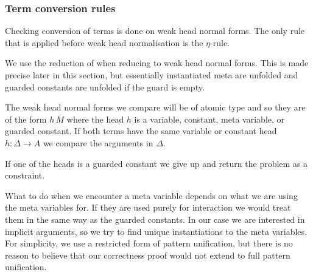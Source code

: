 \subsubsection{Term conversion rules}

Checking conversion of terms is done on weak head normal forms. The only rule
that is applied before weak head normalisation is the $\eta$-rule.


We use the reduction of {\Core} when reducing to weak head normal forms. This
is made precise later in this section, but essentially instantiated meta are
unfolded and guarded constants are unfolded if the guard is empty.

The weak head normal forms we compare will be of atomic type and so they are of
the form $h\,\bar M$ where the head $h$ is a variable, constant, meta variable,
or guarded constant. If both terms have the same variable or constant head $h :
\Delta \to A$ we compare the arguments in $\Delta$.


If one of the heads is a guarded constant we give up and return the problem as
a constraint.


What to do when we encounter a meta variable depends on what we are using the
meta variables for. If they are used purely for interaction we would treat them
in the same way as the guarded constants. In our case we are interested in
implicit arguments, so we try to find unique instantiations to the meta
variables. For simplicity, we use a restricted form of pattern
unification, but there is no
reason to believe that our correctness proof would not extend to full pattern
unification.

